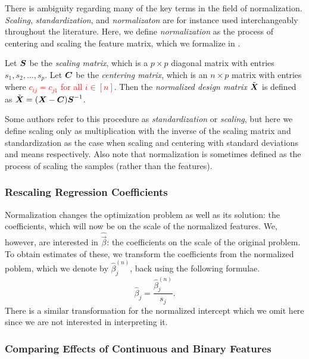 There is ambiguity regarding many of the key terms in the field of normalization. \emph{Scaling}, \emph{standardization}, and \emph{normalizaton} are for instance used interchangeably throughout the literature. Here, we define \emph{normalization} as the process of centering and scaling the feature matrix, which we formalize in .

\begin{definition}[Normalization]
  \label{def:normalization}
  Let \(\boldsymbol S\) be the \emph{scaling matrix}, which is a \(p \times p\) diagonal matrix with entries \(s_1, s_2, \dots, s_p\). Let \(\boldsymbol C\) be the \emph{centering matrix}, which is an \(n \times p\) matrix with entries where \textcolor{red}{\(c_{ij} = c_{j1}\) for all \(i \in [n]\)}. Then the \emph{normalized design matrix} \(\tilde{\boldsymbol X}\) is defined as \(\tilde{\boldsymbol X} = (\boldsymbol X - \boldsymbol C)\boldsymbol S^{-1}\).
\end{definition}

Some authors refer to this procedure as \emph{standardization} or \emph{scaling}, but here we define scaling only as multiplication with the inverse of the scaling matrix and standardization as the case when scaling and centering with standard deviations and means respectively. Also note that normalization is sometimes defined as the process of scaling the samples (rather than the features).

\subsubsection{Rescaling Regression Coefficients}

Normalization changes the optimization problem as well as its solution: the coefficients, which will now be on the scale of the normalized features. We, however, are interested in \(\hat{\vec{\beta}}\): the coefficients on the scale of the original problem. To obtain estimates of these, we transform the coefficients from the normalized poblem, which we denote by \(\hat\beta^{(n)}_j\), back using the following formulae.
\[
  \hat\beta_j = \frac{\hat\beta^{(n)}_j}{s_j}.
\]
There is a similar transformation for the normalized intercept which we omit here since we are not interested in interpreting it.

\subsubsection{Comparing Effects of Continuous and Binary Features}

